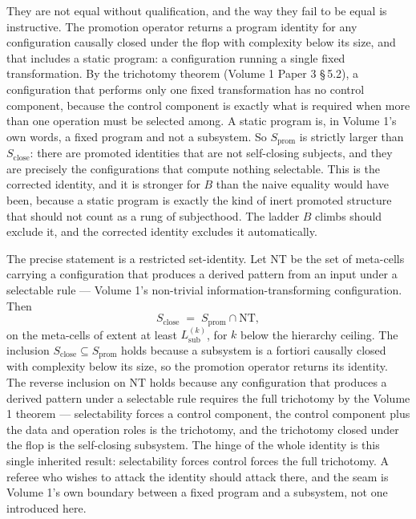 \documentclass[11pt,oneside]{report}
\theoremstyle{definition}
\theoremstyle{remark}
\begin{document}
They are not equal without qualification, and the way they fail to be equal
is instructive. The promotion operator returns a program identity for any
configuration causally closed under the flop with complexity below its size,
and that includes a static program: a configuration running a single fixed
transformation. By the trichotomy theorem (Volume 1 Paper 3 \S\,5.2), a
configuration that performs only one fixed transformation has no control
component, because the control component is exactly what is required when more
than one operation must be selected among. A static program is, in Volume 1's
own words, a fixed program and not a subsystem. So \ensuremath{S_{\mathrm{prom}}}
is strictly larger than \ensuremath{S_{\mathrm{close}}}: there are promoted
identities that are not self-closing subjects, and they are precisely the
configurations that compute nothing selectable. This is the corrected
identity, and it is stronger for \ensuremath{B} than the naive equality would
have been, because a static program is exactly the kind of inert promoted
structure that should not count as a rung of subjecthood. The ladder
\ensuremath{B} climbs should exclude it, and the corrected identity excludes
it automatically.

The precise statement is a restricted set-identity. Let \ensuremath{\mathrm{NT}}
be the set of meta-cells carrying a configuration that produces a derived
pattern from an input under a selectable rule --- Volume 1's non-trivial
information-transforming configuration. Then
\[
S_{\mathrm{close}} \;=\; S_{\mathrm{prom}} \cap \mathrm{NT},
\]
on the meta-cells of extent at least \ensuremath{L_{\mathrm{sub}}^{(k)}}, for
\ensuremath{k} below the hierarchy ceiling. The inclusion
\ensuremath{S_{\mathrm{close}} \subseteq S_{\mathrm{prom}}} holds because a
subsystem is a fortiori causally closed with complexity below its size, so the
promotion operator returns its identity. The reverse inclusion on
\ensuremath{\mathrm{NT}} holds because any configuration that produces a
derived pattern under a selectable rule requires the full trichotomy by the
Volume 1 theorem --- selectability forces a control component, the control
component plus the data and operation roles is the trichotomy, and the
trichotomy closed under the flop is the self-closing subsystem. The hinge of
the whole identity is this single inherited result: selectability forces
control forces the full trichotomy. A referee who wishes to attack the
identity should attack there, and the seam is Volume 1's own boundary between
a fixed program and a subsystem, not one introduced here.
\end{document}
